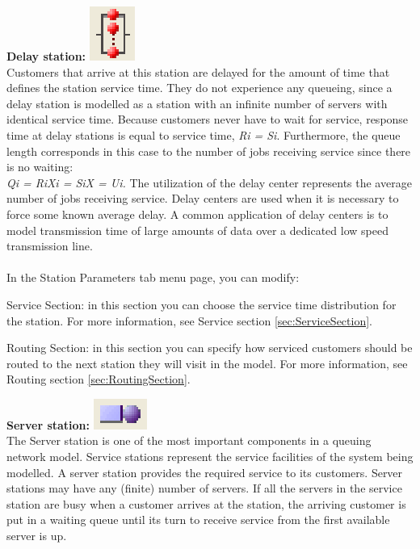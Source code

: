 \begin{enumerate*}
\item \textbf{Delay station:} \includegraphics[scale=1]{img/jsim/delay.eps}\\
Customers that arrive at this station are delayed for the amount of time that defines the station service time. They do not experience any queueing, since a delay station is modelled as a station with an infinite number of servers with identical service time. Because customers never have to wait for service, response time at delay
stations is equal to service time, \emph{Ri = Si}. Furthermore, the queue length corresponds in this case to the number of jobs receiving service since there is no waiting:\\
\emph{Qi = RiXi = SiX = Ui. }
The utilization of the delay center represents the average number of jobs receiving service.
Delay centers are used when it is necessary to force some known average delay. A common application of delay centers is to model
transmission time of large amounts of data over a dedicated low speed transmission line.\\\\
In the Station Parameters tab menu page, you can modify:
\begin{description*}
\item[Service Section:]
in this section you can choose the service time distribution for the station.
For more information, see Service section \autoref{sec:ServiceSection}.
\item[Routing Section:]
in this section you can specify how serviced customers should be routed to the next station they will visit in the model.
For more information, see Routing section \autoref{sec:RoutingSection}.
\end{description*}
\item \textbf{Server station:} \includegraphics[scale=1]{img/jsim/server.eps}\\
The Server station is one of the most important components in a queuing network model. Service stations represent the service facilities of the system being modelled. A server station provides the required service to its customers. Server stations may have any (finite) number of servers. If all the servers in the service station are busy when a customer arrives at the station, the arriving customer is put in a waiting queue until its turn to receive service from the first available server is up.

\end{enumerate*}
